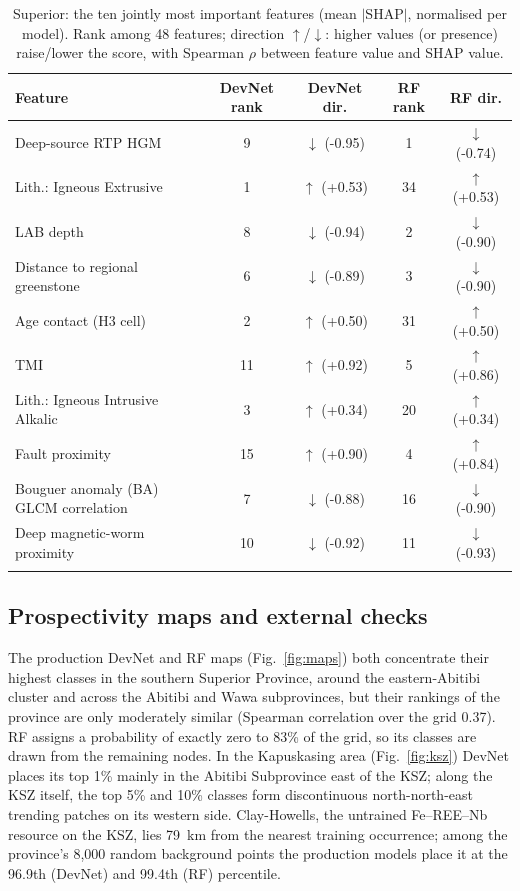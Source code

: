 \documentclass[pdflatex,sn-apa]{sn-jnl}
\begin{document}
\begin{table}[t]
\caption{Superior: the ten jointly most important features (mean $|$SHAP$|$, normalised per model). Rank among 48 features; direction $\uparrow$/$\downarrow$: higher values (or presence) raise/lower the score, with Spearman $\rho$ between feature value and SHAP value.}\label{tab:shap}
\scriptsize
\setlength{\tabcolsep}{2.5pt}
\begin{tabular*}{\textwidth}{@{\extracolsep\fill}lcccc}
\toprule
Feature & DevNet rank & DevNet dir. & RF rank & RF dir. \\
\midrule
Deep-source RTP HGM & 9 & $\downarrow$ (-0.95) & 1 & $\downarrow$ (-0.74) \\
Lith.: Igneous Extrusive & 1 & $\uparrow$ (+0.53) & 34 & $\uparrow$ (+0.53) \\
LAB depth & 8 & $\downarrow$ (-0.94) & 2 & $\downarrow$ (-0.90) \\
Distance to regional greenstone & 6 & $\downarrow$ (-0.89) & 3 & $\downarrow$ (-0.90) \\
Age contact (H3 cell) & 2 & $\uparrow$ (+0.50) & 31 & $\uparrow$ (+0.50) \\
TMI & 11 & $\uparrow$ (+0.92) & 5 & $\uparrow$ (+0.86) \\
Lith.: Igneous Intrusive Alkalic & 3 & $\uparrow$ (+0.34) & 20 & $\uparrow$ (+0.34) \\
Fault proximity & 15 & $\uparrow$ (+0.90) & 4 & $\uparrow$ (+0.84) \\
Bouguer anomaly (BA) GLCM correlation & 7 & $\downarrow$ (-0.88) & 16 & $\downarrow$ (-0.90) \\
Deep magnetic-worm proximity & 10 & $\downarrow$ (-0.92) & 11 & $\downarrow$ (-0.93) \\
\botrule
\end{tabular*}
\end{table}

\subsection{Prospectivity maps and external checks}\label{sec:res-maps}

The production DevNet and RF maps (Fig.~\ref{fig:maps}) both concentrate their highest classes in the southern Superior Province, around the eastern-Abitibi cluster and across the Abitibi and Wawa subprovinces, but their rankings of the province are only moderately similar (Spearman correlation over the grid 0.37). RF assigns a probability of exactly zero to 83\% of the grid, so its classes are drawn from the remaining nodes. In the Kapuskasing area (Fig.~\ref{fig:ksz}) DevNet places its top 1\% mainly in the Abitibi Subprovince east of the KSZ; along the KSZ itself, the top 5\% and 10\% classes form discontinuous north-north-east trending patches on its western side. Clay-Howells, the untrained Fe--REE--Nb resource on the KSZ, lies 79~km from the nearest training occurrence; among the province's 8,000 random background points the production models place it at the 96.9th (DevNet) and 99.4th (RF) percentile.
\end{document}

